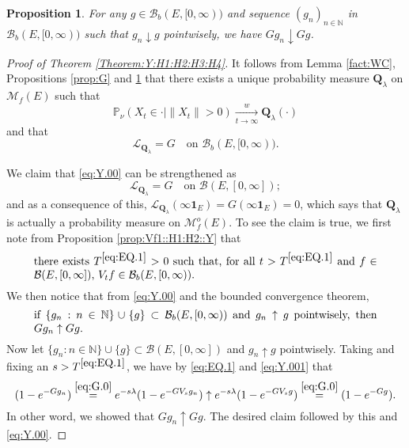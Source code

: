 \documentclass[12pt,a4paper]{amsart}
\numberwithin{equation}{section}
\theoremstyle{plain}
\newtheorem{prop}[thm]{Proposition}
\theoremstyle{definition}
\theoremstyle{remark}
\begin{document}
\begin{prop} \label{prop::GD:H1:H2:H3:H4::Y}
	For any $g\in \mathcal B_b(E,[0,\infty))$ and 
	sequence $(g_n)_{n\in \mathbb N}$ in $\mathcal B_b(E,[0,\infty))$
	such that $g_n \downarrow g$ pointwisely,
	we have $G g_n \downarrow Gg$.
\end{prop}

\begin{proof}[Proof of Theorem \ref{Theorem:Y:H1:H2:H3:H4}]
	It follows from Lemma \ref{fact:WC}, Propositions \ref{prop:G} and \ref{prop::GD:H1:H2:H3:H4::Y} that there exists a unique probability measure $\mathbf Q_\lambda$ on $\mathcal M_f(E)$ such that
\begin{equation}\label{eq:Y.0}
 	\mathbb P_{\nu}(X_t \in \cdot | \|X_t\|>0 )
	\xrightarrow[t\to \infty]{w} \mathbf Q_\lambda(\cdot)
\end{equation}
	and that
\begin{equation} \label{eq:Y.00}
	\mathscr L_{\mathbf Q_\lambda} = G \quad \mbox{on } \mathcal B_b(E,[0,\infty)).
\end{equation}


	We claim that \eqref{eq:Y.00} can be strengthened as
\begin{equation} \label{eq:Y.000}
	\mathscr L_{\mathbf Q_\lambda}
	= G \quad \mbox{on } \mathcal B(E,[0,\infty]);
\end{equation}
	and as a consequence of this, 
$\mathscr L_{\mathbf Q_\lambda}(\infty \mathbf 1_E) = G(\infty \mathbf 1_E)= 0$, which says that $\mathbf Q_\lambda$ is actually a probability measure on $\mathcal M_f^o(E)$.
	To see the claim is true, we first note from Proposition \ref{prop:Vf1::H1:H2::Y} that
\begin{equation} \label{eq:EQ.1} \begin{minipage}{0.9\textwidth}
	there exists $T^{\eqref{eq:EQ.1}}>0$ such that, for all $t>T^{\eqref{eq:EQ.1}}$ and $f\in \mathcal B(E,[0,\infty])$, $V_tf \in \mathcal B_b(E,[0,\infty))$.
\end{minipage} \end{equation}
	 We then notice that from \eqref{eq:Y.00} and the bounded convergence theorem,
\begin{equation} \label{eq:Y.001}
\begin{minipage}{0.9\textwidth}
	if $\{g_n:n\in \mathbb N\} \cup \{g\} \subset \mathcal B_b(E,[0,\infty))$ and $g_n \uparrow g$ pointwisely, then $Gg_n \uparrow Gg$.
\end{minipage}
\end{equation}
	Now let $\{g_n:n\in \mathbb N\} \cup \{g\} \subset \mathcal B(E,[0,\infty])$ and $g_n \uparrow g$ pointwisely.
	Taking and fixing an $s > T^{\eqref{eq:EQ.1}}$, we have by \eqref{eq:EQ.1} and \eqref{eq:Y.001} that
\[
	(1 - e^{-G g_n})
	\overset{\eqref{eq:G.0}} = e^{- s\lambda } (1 - e^{- G V_s g_n})
	\uparrow e^{- s\lambda } (1 - e^{- G V_s g})
	\overset{\eqref{eq:G.0}} =(1 - e^{-G g}).
\]
	In other word, we showed that $Gg_n \uparrow Gg$.
	The desired claim followed by this and \eqref{eq:Y.00}.



\end{proof}
\end{document}
